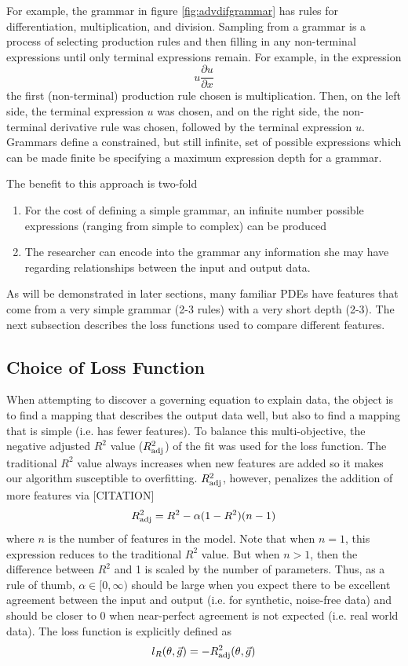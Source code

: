 \documentclass{article}
\begin{document}
For example, the grammar in figure \ref{fig:advdifgrammar} has rules for differentiation, multiplication, and division. Sampling from a grammar is a process of selecting production rules and then filling in any non-terminal expressions until only terminal expressions remain. For example, in the expression 
\begin{equation}
    u \frac{\partial u}{\partial x }
\end{equation}
the first (non-terminal) production rule chosen is multiplication. Then, on the left side, the terminal expression $u$ was chosen, and on the right side, the non-terminal derivative rule was chosen, followed by the terminal expression $u$. Grammars define a constrained, but still infinite, set of possible expressions which can be made finite be specifying a maximum expression depth for a grammar. 

The benefit to this approach is two-fold
\begin{enumerate}
    \item For the cost of defining a simple grammar, an infinite number possible expressions (ranging from simple to complex) can be produced
    \item The researcher can encode into the grammar any information she may have regarding relationships between the input and output data.
\end{enumerate}
As will be demonstrated in later sections, many familiar PDEs have features that come from a very simple grammar (2-3 rules) with a very short depth (2-3). The next subsection describes the loss functions used to compare different features.  

\subsection{Choice of Loss Function}
\label{lossfunction}
When attempting to discover a governing equation to explain data, the object is to find a mapping that describes the output data well, but also to find a mapping that is simple (i.e. has fewer features). To balance this multi-objective, the negative adjusted $R^2$ value ($R_{\rm adj}^2$) of the fit was used for the loss function. The traditional $R^2$ value always increases when new features are added so it makes our algorithm susceptible to overfitting. $R_{\rm adj}^2$, however, penalizes the addition of more features via [CITATION]
\[R_{\rm adj}^2 = R^2 - \alpha (1-  R^2)(n-1)\]
where $n$ is the number of features in the model. Note that when $n=1$, this expression reduces to the traditional $R^2$ value. But when $n>1$, then the difference between $R^2$ and 1 is scaled by the number of parameters. Thus, as a rule of thumb, $\alpha \in [0, \infty)$ should be large when you expect there to be excellent agreement between the input and output (i.e. for synthetic, noise-free data) and should be closer to 0 when near-perfect agreement is not expected (i.e. real world data). The loss function is explicitly defined as 
\begin{equation}
    l_R(\theta, \vec{g}) = - R_{\rm adj}^2(\theta, \vec{g})
\end{equation}
\end{document}
